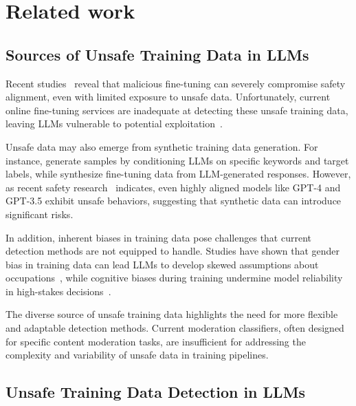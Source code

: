 \section{Related work}
\subsection{Sources of Unsafe Training Data in LLMs} 

Recent studies~\citep{yi-etal-2024-vulnerability, qi2023finetuningalignedlanguagemodels} reveal that malicious fine-tuning can severely compromise safety alignment, even with limited exposure to unsafe data. Unfortunately, current online fine-tuning services are inadequate at detecting these unsafe training data, leaving LLMs vulnerable to potential exploitation~\citep{qi2023finetuningalignedlanguagemodels}. 

Unsafe data may also emerge from synthetic training data generation. For instance, \citet{wang-etal-2022-promda} generate samples by conditioning LLMs on specific keywords and target labels, while \citet{wang-etal-2023-self-instruct} synthesize fine-tuning data from LLM-generated responses. However, as recent safety research~\citep{wang2024decodingtrustcomprehensiveassessmenttrustworthiness} indicates, even highly aligned models like GPT-4 and GPT-3.5 exhibit unsafe behaviors, suggesting that synthetic data can introduce significant risks.

In addition, inherent biases in training data pose challenges that current detection methods are not equipped to handle. Studies have shown that gender bias in training data can lead LLMs to develop skewed assumptions about occupations~\citep{Kotek_2023}, while cognitive biases during training undermine model reliability in high-stakes decisions~\citep{itzhak2024instructedbiasinstructiontunedlanguage, echterhoff-etal-2024-cognitive}.

The diverse source of unsafe training data highlights the need for more flexible and adaptable detection methods. Current moderation classifiers, often designed for specific content moderation tasks, are insufficient for addressing the complexity and variability of unsafe data in training pipelines. 

\subsection{Unsafe Training Data Detection in LLMs}

